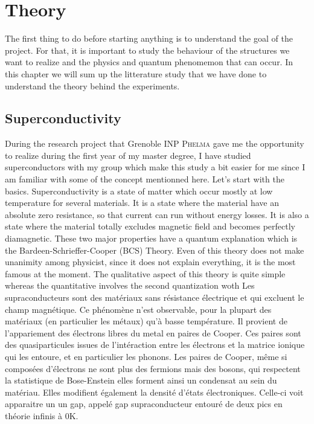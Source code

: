 \chapter{Theory}
 \label{Chap1}
 
    The first thing to do before starting anything is to understand the goal of the project. For that, it is important to study the behaviour of the structures we want to realize and the physics and quantum phenomemon that can occur. In this chapter we will sum up the litterature study that we have done to understand the theory behind the experiments.
        
        \section{Superconductivity}
            During the research project that Grenoble INP \textsc{Phelma} gave me the opportunity to realize during the first year of my master degree, I have studied superconductors with my group which make this study a bit easier for me since I am familiar with some of the concept mentionned here. Let's start with the basics. 
            Superconductivity is a state of matter which occur mostly at low temperature for several materials. It is a state where the material have an absolute zero resistance, so that current can run without energy losses. It is also a state where the material totally excludes magnetic field and becomes perfectly diamagnetic. These two major properties have a quantum explanation which is the Bardeen-Schrieffer-Cooper (BCS) Theory. Even of this theory does not make unanimity among physicist, since it does not explain everything, it is the most famous at the moment. The qualitative aspect of this theory is quite simple whereas the quantitative involves the second quantization woth            
            Les supraconducteurs sont des matériaux sans résistance électrique et qui excluent le champ magnétique. Ce phénomène n'est observable, pour la plupart des matériaux (en particulier les métaux) qu'à basse température. Il provient de l'appariement des électrons libres du metal en paires de Cooper. Ces paires sont des quasiparticules issues de l'intéraction entre les électrons et la matrice ionique qui les entoure, et en particulier les phonons. Les paires de Cooper, même si composées d'électrons ne sont plus des fermions mais des bosons, qui respectent la statistique de Bose-Enstein elles forment ainsi un condensat au sein du matériau. Elles modifient également la densité d'états électroniques. Celle-ci voit apparaitre un un gap, appelé gap supraconducteur entouré de deux pics en théorie infinis à 0K.
            
